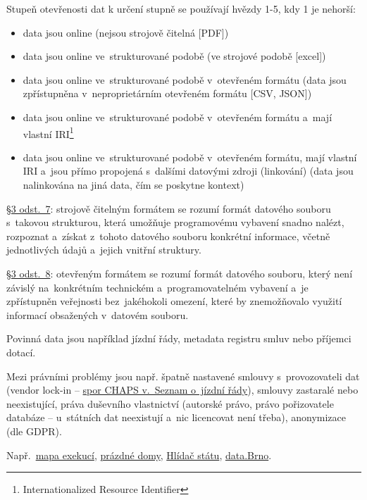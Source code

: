 Stupeň otevřenosti dat k určení stupně se používají hvězdy 1-5, kdy 1 je nehorší:

\begin{itemize}
\item data jsou online (nejsou strojově čitelná [PDF])
\item data jsou online ve~strukturované podobě (ve strojové podobě [excel])
\item data jsou online ve~strukturované podobě v~otevřeném formátu (data jsou zpřístupněna v~neproprietárním otevřeném formátu [CSV, JSON])
\item data jsou online ve~strukturované podobě v~otevřeném formátu a~mají vlastní IRI\footnote{Internationalized Resource Identifier} 
\item data jsou online ve~strukturované podobě v~otevřeném formátu, mají vlastní IRI a~jsou přímo propojená s~dalšími datovými zdroji (linkování) (data jsou nalinkována na jiná data, čím se poskytne kontext)
\end{itemize}

\href{https://www.zakonyprolidi.cz/cs/1999-106#p3-7}{§3 odst.~7}: strojově čitelným formátem se rozumí formát datového souboru s~takovou strukturou, která umožňuje programovému vybavení snadno nalézt, rozpoznat a~získat z~tohoto datového souboru konkrétní informace, včetně jednotlivých údajů a~jejich vnitřní struktury.

\href{https://www.zakonyprolidi.cz/cs/1999-106#p3-8}{§3 odst.~8}: otevřeným formátem se rozumí formát datového souboru, který není závislý na~konkrétním technickém a~programovatelném vybavení a~je zpřístupněn veřejnosti bez~jakéhokoli omezení, které by znemožňovalo využití informací obsažených v~datovém souboru.

Povinná data jsou například jízdní řády, metadata registru smluv nebo příjemci dotací.

Mezi právními problémy jsou např. špatně nastavené smlouvy s~provozovateli dat (vendor lock-in -- \href{http://ictjudikatura.law.muni.cz/wiki/6_As_38/2015_-_51_-_\%C5\%BD\%C3\%A1dost_o_specifick\%C3\%BD_form\%C3\%A1t_informac\%C3\%AD_(CHAPS)}{spor CHAPS v.~Seznam o~jízdní řády}), smlouvy zastaralé nebo neexistující, práva duševního vlastnictví (autorské právo, právo pořizovatele databáze -- u~státních dat neexistují a~nic licencovat není třeba), anonymizace (dle GDPR).

Např.~\href{https://mapaexekuci.cz}{mapa exekucí}, \href{https://prazdnedomy.cz}{prázdné domy}, \href{https://hlidacstatu.cz}{Hlídač státu}, \href{https://data.brno.cz}{data.Brno}.
